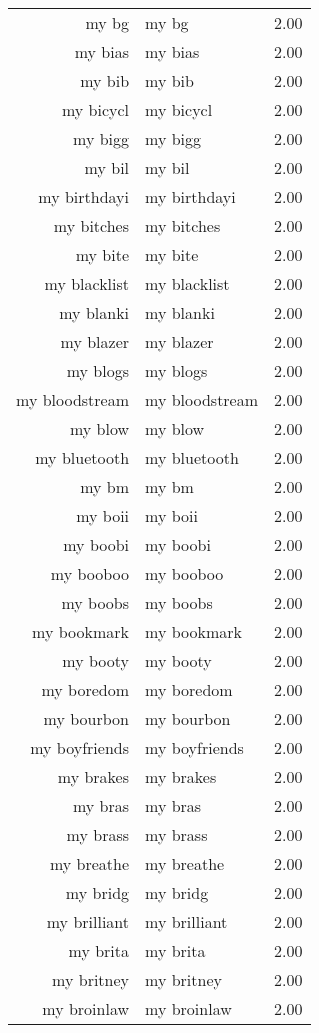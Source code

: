\begin{table}[ht]
\begin{tabular}{rlr}
  my bg & my bg & 2.00 \\ 
  my bias & my bias & 2.00 \\ 
  my bib & my bib & 2.00 \\ 
  my bicycl & my bicycl & 2.00 \\ 
  my bigg & my bigg & 2.00 \\ 
  my bil & my bil & 2.00 \\ 
  my birthdayi & my birthdayi & 2.00 \\ 
  my bitches & my bitches & 2.00 \\ 
  my bite & my bite & 2.00 \\ 
  my blacklist & my blacklist & 2.00 \\ 
  my blanki & my blanki & 2.00 \\ 
  my blazer & my blazer & 2.00 \\ 
  my blogs & my blogs & 2.00 \\ 
  my bloodstream & my bloodstream & 2.00 \\ 
  my blow & my blow & 2.00 \\ 
  my bluetooth & my bluetooth & 2.00 \\ 
  my bm & my bm & 2.00 \\ 
  my boii & my boii & 2.00 \\ 
  my boobi & my boobi & 2.00 \\ 
  my booboo & my booboo & 2.00 \\ 
  my boobs & my boobs & 2.00 \\ 
  my bookmark & my bookmark & 2.00 \\ 
  my booty & my booty & 2.00 \\ 
  my boredom & my boredom & 2.00 \\ 
  my bourbon & my bourbon & 2.00 \\ 
  my boyfriends & my boyfriends & 2.00 \\ 
  my brakes & my brakes & 2.00 \\ 
  my bras & my bras & 2.00 \\ 
  my brass & my brass & 2.00 \\ 
  my breathe & my breathe & 2.00 \\ 
  my bridg & my bridg & 2.00 \\ 
  my brilliant & my brilliant & 2.00 \\ 
  my brita & my brita & 2.00 \\ 
  my britney & my britney & 2.00 \\ 
  my broinlaw & my broinlaw & 2.00 \\ 

\end{tabular}
\end{table}
